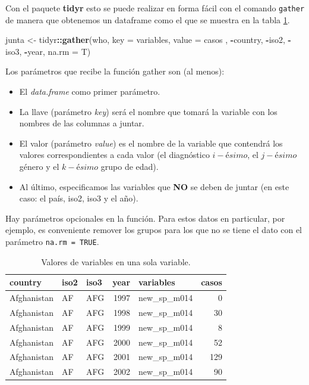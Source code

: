 \documentclass[]{article}
\newenvironment{Shaded}{\begin{snugshade}}{\end{snugshade}}
\newcommand{\KeywordTok}[1]{\textcolor[rgb]{0.13,0.29,0.53}{\textbf{#1}}}
\newcommand{\DataTypeTok}[1]{\textcolor[rgb]{0.13,0.29,0.53}{#1}}
\newcommand{\StringTok}[1]{\textcolor[rgb]{0.31,0.60,0.02}{#1}}
\newcommand{\OperatorTok}[1]{\textcolor[rgb]{0.81,0.36,0.00}{\textbf{#1}}}
\newcommand{\NormalTok}[1]{#1}
\providecommand{\tightlist}{%
  \setlength{\itemsep}{0pt}\setlength{\parskip}{0pt}}
\begin{document}
Con el paquete \textbf{tidyr} esto se puede realizar en forma fácil con
el comando \texttt{gather} de manera que obtenemos un dataframe como el
que se muestra en la tabla \ref{tab:varsjuntadas}.

\begin{Shaded}
\begin{Highlighting}[]
\NormalTok{junta <-}\StringTok{ }\NormalTok{tidyr}\OperatorTok{::}\KeywordTok{gather}\NormalTok{(who, }\DataTypeTok{key =}\NormalTok{ variables, }\DataTypeTok{value =}\NormalTok{ casos}
\NormalTok{                       , }\OperatorTok{-}\NormalTok{country, }\OperatorTok{-}\NormalTok{iso2, }\OperatorTok{-}\NormalTok{iso3, }\OperatorTok{-}\NormalTok{year, }\DataTypeTok{na.rm =}\NormalTok{ T)}
\end{Highlighting}
\end{Shaded}

Los parámetros que recibe la función gather son (al menos):

\begin{itemize}
\tightlist
\item
  El \emph{data.frame} como primer parámetro.
\item
  La llave (parámetro \emph{key}) será el nombre que tomará la variable
  con los nombres de las columnas a juntar.
\item
  El valor (parámetro \emph{value}) es el nombre de la variable que
  contendrá los valores correspondientes a cada valor (el diagnóstico
  \(i-ésimo\), el \(j-ésimo\) género y el \(k-ésimo\) grupo de edad).
\item
  Al último, especificamos las variables que \textbf{NO} se deben de
  juntar (en este caso: el país, iso2, iso3 y el año).
\end{itemize}

Hay parámetros opcionales en la función. Para estos datos en particular,
por ejemplo, es conveniente remover los grupos para los que no se tiene
el dato con el parámetro \texttt{na.rm\ =\ TRUE}.

\begin{table}[ht]
\centering
\begingroup\tiny
\begin{tabular}{lllrlr}
  \hline
country & iso2 & iso3 & year & variables & casos \\ 
  \hline
Afghanistan & AF & AFG & 1997 & new\_sp\_m014 &   0 \\ 
  Afghanistan & AF & AFG & 1998 & new\_sp\_m014 &  30 \\ 
  Afghanistan & AF & AFG & 1999 & new\_sp\_m014 &   8 \\ 
  Afghanistan & AF & AFG & 2000 & new\_sp\_m014 &  52 \\ 
  Afghanistan & AF & AFG & 2001 & new\_sp\_m014 & 129 \\ 
  Afghanistan & AF & AFG & 2002 & new\_sp\_m014 &  90 \\ 
   \hline
\end{tabular}
\endgroup
\caption{Valores de variables en una sola variable.} 
\label{tab:varsjuntadas}
\end{table}
\end{document}
